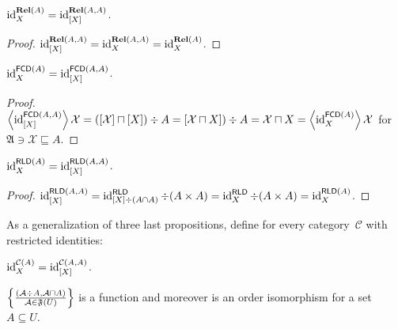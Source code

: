 \begin{prop}
$\operatorname{id}^{\mathcal{\mathbf{Rel}}(A)}_X = \operatorname{id}^{\mathcal{\mathbf{Rel}}(A,A)}_{[X]}$.
\end{prop}

\begin{proof}
$\operatorname{id}^{\mathcal{\mathbf{Rel}}(A,A)}_{[X]}=
\operatorname{id}^{\mathcal{\mathbf{Rel}}(A,A)}_X=
\operatorname{id}^{\mathcal{\mathbf{Rel}}(A)}_X$.
\end{proof}

\begin{prop}
$\operatorname{id}^{\mathcal{\mathsf{FCD}}(A)}_X = \operatorname{id}^{\mathcal{\mathsf{FCD}}(A,A)}_{[X]}$.
\end{prop}

\begin{proof}
$\left\langle \operatorname{id}^{\mathcal{\mathsf{FCD}}(A,A)}_{[X]}\right\rangle\mathcal{X}=
([\mathcal{X}]\sqcap[X])\div A=
[\mathcal{X}\sqcap X])\div A=\mathcal{X}\sqcap X=
\left\langle \operatorname{id}^{\mathcal{\mathsf{FCD}}(A)}_X\right\rangle\mathcal{X}$
for~$\mathfrak{A}\ni\mathcal{X}\sqsubseteq A$.
\end{proof}

\begin{prop}
$\operatorname{id}^{\mathcal{\mathsf{RLD}}(A)}_X = \operatorname{id}^{\mathcal{\mathsf{RLD}}(A,A)}_{[X]}$.
\end{prop}

\begin{proof}
$\operatorname{id}^{\mathcal{\mathsf{RLD}}(A,A)}_{[X]}=
\operatorname{id}^{\mathsf{RLD}}_{[X]\div(A\cap A)}\div(A\times A)=
\operatorname{id}^{\mathsf{RLD}}_X\div(A\times A)=\operatorname{id}^{\mathsf{RLD}(A)}_X$.
\end{proof}

As a generalization of three last propositions, define for
every category~$\mathcal{C}$ with restricted identities:

\begin{defn}
$\operatorname{id}^{\mathcal{C}(A)}_X = \operatorname{id}^{\mathcal{C}(A,A)}_{[X]}$.
\end{defn}

\begin{prop}
  $\left\{ \frac{ (\mathcal{A} \div A , \mathcal{A} \sqcap A) }{
  \mathcal{A} \in \mathfrak{F} (U) }\right\}$ is a function and
  moreover is an order isomorphism for a set $A \subseteq U$.
\end{prop}

